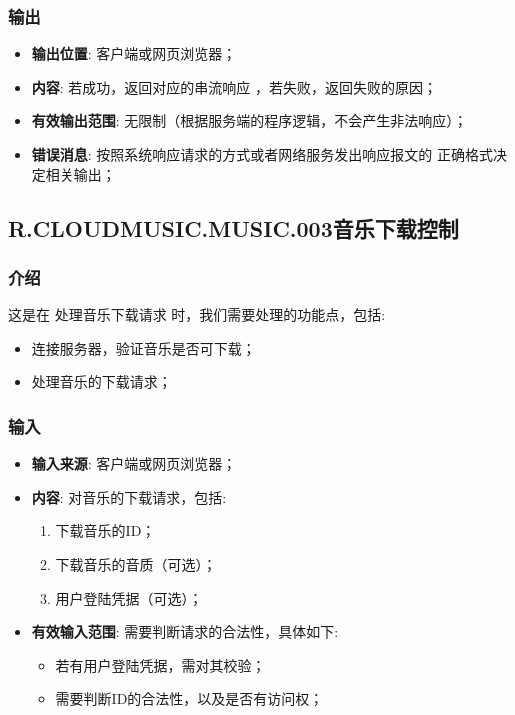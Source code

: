 \begin{enumerate}
\subsubsection{输出}
\begin{itemize}
	\item \textbf{输出位置}: 客户端或网页浏览器；
	\item \textbf{内容}: 若成功，返回对应的串流响应 ，若失败，返回失败的原因；
	\item \textbf{有效输出范围}: 无限制（根据服务端的程序逻辑，不会产生非法响应）；
	\item \textbf{错误消息}: 按照系统响应请求的方式或者网络服务发出响应报文的
		正确格式决定相关输出；
\end{itemize}

\subsection{R.CLOUDMUSIC.MUSIC.003音乐下载控制}
\subsubsection{介绍}
	这是在 处理音乐下载请求 时，我们需要处理的功能点，包括: 
	\begin{itemize}
		\item 连接服务器，验证音乐是否可下载；
		\item 处理音乐的下载请求；
	\end{itemize}
\subsubsection{输入}
	\begin{itemize}
		\item \textbf{输入来源}: 客户端或网页浏览器；
		\item \textbf{内容}: 对音乐的下载请求，包括: 
		\begin{enumerate}
			\item 下载音乐的ID；
			\item 下载音乐的音质（可选）；
			\item 用户登陆凭据（可选）；
		\end{enumerate}
		\item \textbf{有效输入范围}: 需要判断请求的合法性，具体如下: 
		\begin{itemize}
			\item 若有用户登陆凭据，需对其校验； 
			\item 需要判断ID的合法性，以及是否有访问权；
		\end{itemize}
	\end{itemize}

\end{enumerate}
